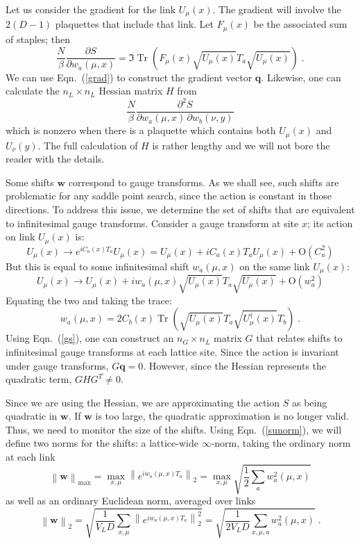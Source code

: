 \documentclass[preprint,aps,prd]{revtex4-2}
\newcommand{\da}{\dagger}  %
\newcommand{\be}{\begin{equation}}
\newcommand{\eq}{\end{equation}}
\DeclareMathOperator{\Tr}{Tr}
\begin{document}
Let us consider the gradient for the link $U_\mu(x)$.
The gradient will involve the $2 (D-1)$ plaquettes that include that link.
Let $F_\mu(x)$ be the associated sum of staples; then
\be
   \frac{N}{\beta} \frac{\partial S}{\partial w_a(\mu, x)} =
   \Im\Tr\left(F_\mu(x) \sqrt{U_\mu(x)} T_a \sqrt{U_\mu(x)}\right) \; .
   \label{grad}
\eq
We can use Eqn.~(\ref{grad}) to construct the gradient vector $\mathbf{q}$.
Likewise, one can calculate the $n_L\times n_L$ Hessian matrix
$H$ from
\be
      \frac{N}{\beta} \frac{\partial^2 S}{\partial w_a(\mu, x)\, \partial w_b(\nu, y)}
\eq
which is nonzero when there is a plaquette which contains both
$U_\mu(x)$ and $U_\nu(y)$.
The full calculation of $H$ is rather lengthy and we will not bore the reader
with the details.

Some shifts $\mathbf{w}$ correspond to gauge transforms.
As we shall see, such shifts are problematic for any saddle
point search, since the action is constant in those directions.
To address this issue, we determine the set of shifts that are
equivalent to infinitesimal gauge transforms.  Consider a gauge transform
at site $x$; its action on link $U_\mu(x)$ is:
\be
U_\mu(x) \to e^{i C_a(x) T_a} U_\mu(x) = U_\mu(x) + i C_a(x) T_a U_\mu(x) +
       \mathrm{O}\!\left(C_a^2\right)
\eq
But this is equal to some infinitesimal shift $w_a(\mu, x)$ on
the same link $U_\mu(x)$:
\be
U_\mu(x) \to U_\mu(x) + i w_a(\mu,x) \sqrt{U_\mu(x)}T_a \sqrt{U_\mu(x)} +
       \mathrm{O}\!\left(w_a^2\right)
\eq
%
Equating the two and taking the trace:
\be
w_a(\mu,x) = 2 C_b(x) \Tr\left(\sqrt{U_\mu(x)} T_a
                     \sqrt{U_\mu^\da(x)} T_b\right) \; . \label{gs}
\eq
Using Eqn.~(\ref{gs}), one can construct an $n_G \times n_L$ matrix
$G$ that relates shifts to infinitesimal gauge transforms
at each lattice site.
Since the action is invariant under gauge transforms, $G \mathbf{q} = 0$.
However, since the Hessian represents the quadratic term, $G H G^T \neq 0$.

Since we are using the Hessian, we are approximating
the action $S$ as being quadratic in $\mathbf{w}$.  If $\mathbf{w}$
is too large, the quadratic approximation is no longer valid.
Thus, we need to monitor the size of the shifts.
Using Eqn.~(\ref{sunorm}), we will define two norms for the shifts:
a lattice-wide $\infty$-norm, taking the ordinary norm at each link
\be
\left\lVert \mathbf{w}\right\rVert_{\mathrm{max}} =
     \max_{x,\mu} \left\lVert e^{i w_{a}(\mu, x) T_a} \right\rVert_2
     = \max_{x,\mu} \sqrt{\frac{1}{2}\sum_a w_a^2(\mu, x)}
\eq
as well as an ordinary Euclidean norm, averaged over links
\be
\left\lVert \mathbf{w}\right\rVert_2 =
      \sqrt{\frac{1}{V_L D} \sum_{x, \mu}
        \left\lVert e^{i w_{a}(\mu, x) T_a} \right\rVert_2^2}
     = \sqrt{\frac{1}{2 V_L D} \sum_{x, \mu, a} w_a^2(\mu, x)}
        \; .  \label{shiftsize}
\eq
\end{document}
